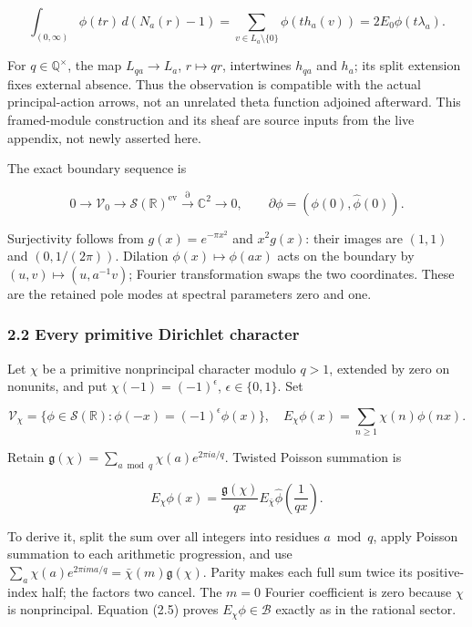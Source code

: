 \documentclass[
]{article}
\begin{document}
\[
\int_{(0,\infty)}\phi(tr)\,d(N_a(r)-1)
=\sum_{v\in L_a\setminus\{0\}}\phi(th_a(v))
=2E_0\phi(t\lambda_a).
\]

For \(q\in\mathbb Q^\times\), the map \(L_{qa}\to L_a\),
\(r\mapsto qr\), intertwines \(h_{qa}\) and \(h_a\); its split extension
fixes external absence. Thus the observation is compatible with the
actual principal-action arrows, not an unrelated theta function adjoined
afterward. This framed-module construction and its sheaf are source
inputs from the live appendix, not newly asserted here.

The exact boundary sequence is

\[
0\to\mathscr V_0\to\mathscr S(\mathbb R)^{\mathrm{ev}}
\xrightarrow{\partial}\mathbb C^2\to0,
\qquad \partial\phi=(\phi(0),\widehat\phi(0)). \tag{2.4}
\]

Surjectivity follows from \(g(x)=e^{-\pi x^2}\) and \(x^2g(x)\): their
images are \((1,1)\) and \((0,1/(2\pi))\). Dilation
\(\phi(x)\mapsto\phi(ax)\) acts on the boundary by
\((u,v)\mapsto(u,a^{-1}v)\); Fourier transformation swaps the two
coordinates. These are the retained pole modes at spectral parameters
zero and one.

\subsubsection{2.2 Every primitive Dirichlet
character}\label{every-primitive-dirichlet-character}

Let \(\chi\) be a primitive nonprincipal character modulo \(q>1\),
extended by zero on nonunits, and put \(\chi(-1)=(-1)^\epsilon\),
\(\epsilon\in\{0,1\}\). Set

\[
\mathscr V_\chi=\{\phi\in\mathscr S(\mathbb R):\phi(-x)=(-1)^\epsilon\phi(x)\},
\quad E_\chi\phi(x)=\sum_{n\ge1}\chi(n)\phi(nx).
\]

Retain \(\mathfrak g(\chi)=\sum_{a\bmod q}\chi(a)e^{2\pi i a/q}\).
Twisted Poisson summation is

\[
E_\chi\phi(x)=\frac{\mathfrak g(\chi)}{qx}
E_{\bar\chi}\widehat\phi\!\left(\frac1{qx}\right). \tag{2.5}
\]

To derive it, split the sum over all integers into residues
\(a\bmod q\), apply Poisson summation to each arithmetic progression,
and use \(\sum_a\chi(a)e^{2\pi i ma/q}=\bar\chi(m)\mathfrak g(\chi)\).
Parity makes each full sum twice its positive-index half; the factors
two cancel. The \(m=0\) Fourier coefficient is zero because \(\chi\) is
nonprincipal. Equation (2.5) proves \(E_\chi\phi\in\mathscr B\) exactly
as in the rational sector.
\end{document}
